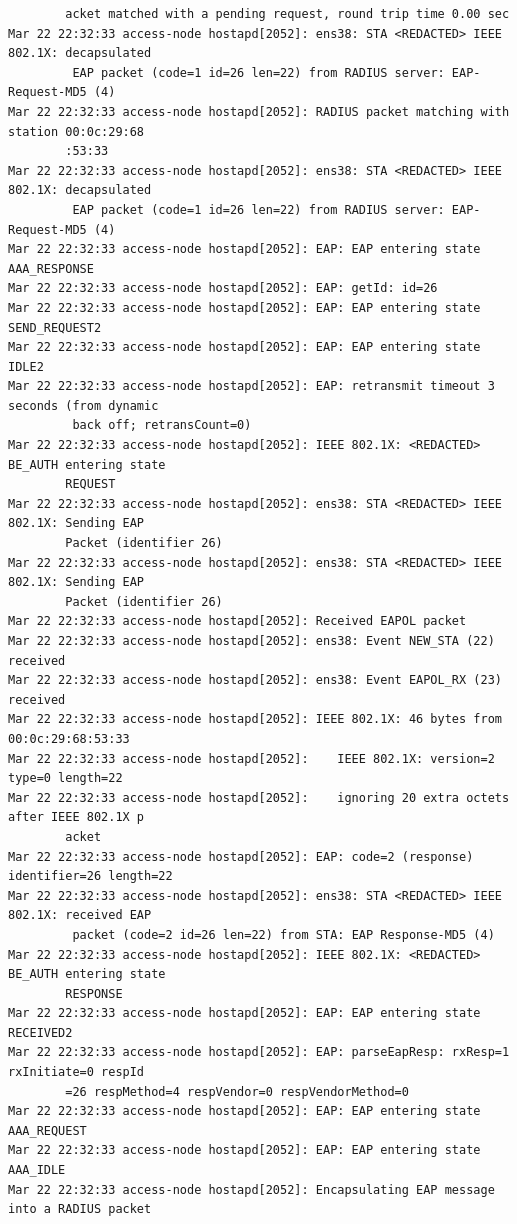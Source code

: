 \documentclass[11pt]{article}
\begin{document}
\begin{verbatim}
        acket matched with a pending request, round trip time 0.00 sec
Mar 22 22:32:33 access-node hostapd[2052]: ens38: STA <REDACTED> IEEE 802.1X: decapsulated
         EAP packet (code=1 id=26 len=22) from RADIUS server: EAP-Request-MD5 (4)
Mar 22 22:32:33 access-node hostapd[2052]: RADIUS packet matching with station 00:0c:29:68
        :53:33
Mar 22 22:32:33 access-node hostapd[2052]: ens38: STA <REDACTED> IEEE 802.1X: decapsulated
         EAP packet (code=1 id=26 len=22) from RADIUS server: EAP-Request-MD5 (4)
Mar 22 22:32:33 access-node hostapd[2052]: EAP: EAP entering state AAA_RESPONSE
Mar 22 22:32:33 access-node hostapd[2052]: EAP: getId: id=26
Mar 22 22:32:33 access-node hostapd[2052]: EAP: EAP entering state SEND_REQUEST2
Mar 22 22:32:33 access-node hostapd[2052]: EAP: EAP entering state IDLE2
Mar 22 22:32:33 access-node hostapd[2052]: EAP: retransmit timeout 3 seconds (from dynamic
         back off; retransCount=0)
Mar 22 22:32:33 access-node hostapd[2052]: IEEE 802.1X: <REDACTED> BE_AUTH entering state 
        REQUEST
Mar 22 22:32:33 access-node hostapd[2052]: ens38: STA <REDACTED> IEEE 802.1X: Sending EAP 
        Packet (identifier 26)
Mar 22 22:32:33 access-node hostapd[2052]: ens38: STA <REDACTED> IEEE 802.1X: Sending EAP 
        Packet (identifier 26)
Mar 22 22:32:33 access-node hostapd[2052]: Received EAPOL packet
Mar 22 22:32:33 access-node hostapd[2052]: ens38: Event NEW_STA (22) received
Mar 22 22:32:33 access-node hostapd[2052]: ens38: Event EAPOL_RX (23) received
Mar 22 22:32:33 access-node hostapd[2052]: IEEE 802.1X: 46 bytes from 00:0c:29:68:53:33
Mar 22 22:32:33 access-node hostapd[2052]:    IEEE 802.1X: version=2 type=0 length=22
Mar 22 22:32:33 access-node hostapd[2052]:    ignoring 20 extra octets after IEEE 802.1X p
        acket
Mar 22 22:32:33 access-node hostapd[2052]: EAP: code=2 (response) identifier=26 length=22
Mar 22 22:32:33 access-node hostapd[2052]: ens38: STA <REDACTED> IEEE 802.1X: received EAP
         packet (code=2 id=26 len=22) from STA: EAP Response-MD5 (4)
Mar 22 22:32:33 access-node hostapd[2052]: IEEE 802.1X: <REDACTED> BE_AUTH entering state 
        RESPONSE
Mar 22 22:32:33 access-node hostapd[2052]: EAP: EAP entering state RECEIVED2
Mar 22 22:32:33 access-node hostapd[2052]: EAP: parseEapResp: rxResp=1 rxInitiate=0 respId
        =26 respMethod=4 respVendor=0 respVendorMethod=0
Mar 22 22:32:33 access-node hostapd[2052]: EAP: EAP entering state AAA_REQUEST
Mar 22 22:32:33 access-node hostapd[2052]: EAP: EAP entering state AAA_IDLE
Mar 22 22:32:33 access-node hostapd[2052]: Encapsulating EAP message into a RADIUS packet

\end{verbatim}
\end{document}
